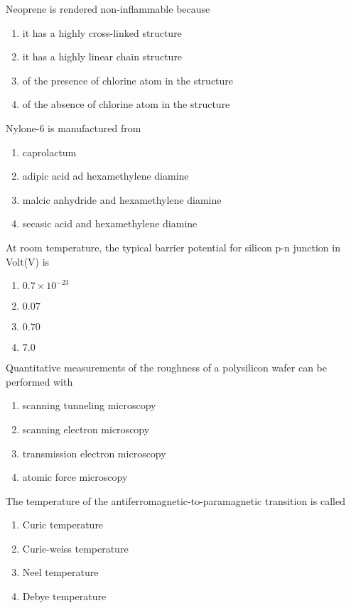 \item Neoprene is rendered non-inflammable because 
\begin{enumerate}
    \item it has a highly cross-linked structure 
    \item it has a highly linear chain structure 
    \item of the presence of chlorine atom in the structure 
    \item of the absence of chlorine atom in the structure \\
\end{enumerate}
\item Nylone-$6$ is manufactured from 
\begin{enumerate}
    \item caprolactum 
    \item adipic acid ad hexamethylene diamine 
    \item malcic anhydride and hexamethylene diamine 
    \item secasic acid and hexamethylene diamine\\
\end{enumerate}
\item At room temperature, the typical barrier potential for silicon p-n junction in Volt(V) is 
\begin{enumerate}
    \item $0.7\times 10^{-23}$
    \item $0.07$
    \item $0.70$
    \item $7.0$\\
\end{enumerate}
\item Quantitative measurements of the roughness of a polysilicon wafer can be performed with 
\begin{enumerate}
    \item scanning tunneling microscopy 
    \item scanning electron microscopy
    \item transmission electron microscopy 
    \item atomic force microscopy\\
\end{enumerate}
\item The temperature of the antiferromagnetic-to-paramagnetic transition is called 
\begin{enumerate}
    \item Curic temperature
    \item Curie-weiss temperature 
    \item Neel temperature
    \item Debye temperature \\
\end{enumerate}
